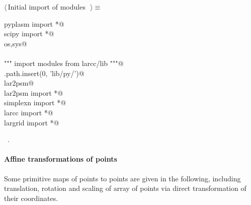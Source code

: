 \documentclass[11pt,oneside]{article}	%
\begin{document}
\begin{flushleft} \small \label{scrap50}
$\langle\,$Initial import of modules\nobreak\ {\footnotesize {}}$\,\rangle\equiv$
\vspace{-1ex}
\begin{list}{}{} \item
\mbox{}\verb@from pyplasm import *@\\
\mbox{}\verb@from scipy import *@\\
\mbox{}\verb@import os,sys@\\
\mbox{}\verb@@\\
\mbox{}\verb@""" import modules from larcc/lib """@\\
\mbox{}\verb@sys.path.insert(0, 'lib/py/')@\\
\mbox{}\verb@import lar2psm@\\
\mbox{}\verb@from lar2psm import *@\\
\mbox{}\verb@from simplexn import *@\\
\mbox{}\verb@from larcc import *@\\
\mbox{}\verb@from largrid import *@\\
\mbox{}\verb@@{\NWsep}
\end{list}
\vspace{-1ex}
\footnotesize\addtolength{\baselineskip}{-1ex}
\begin{list}{}{\setlength{\itemsep}{-\parsep}\setlength{\itemindent}{-\leftmargin}}
\item \NWtxtMacroRefIn\ .
\end{list}
\end{flushleft}


\paragraph{Affine transformations of points} Some primitive maps of points to points are given in the following, including translation, rotation and scaling of array of points via direct transformation of their coordinates.
\end{document}
